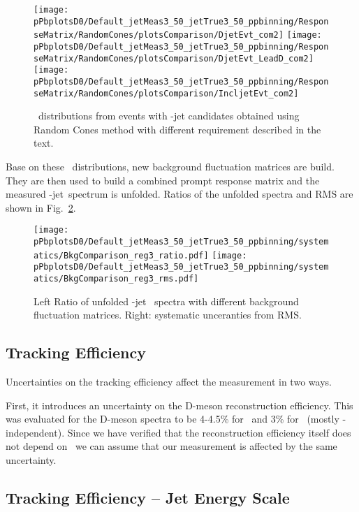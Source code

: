 \begin{figure}[bth]
\centering
\texttt{[image: pPbplotsD0/Default\_jetMeas3\_50\_jetTrue3\_50\_ppbinning/ResponseMatrix/RandomCones/plotsComparison/DjetEvt\_com2]}
\texttt{[image: pPbplotsD0/Default\_jetMeas3\_50\_jetTrue3\_50\_ppbinning/ResponseMatrix/RandomCones/plotsComparison/DjetEvt\_LeadD\_com2]}
\texttt{[image: pPbplotsD0/Default\_jetMeas3\_50\_jetTrue3\_50\_ppbinning/ResponseMatrix/RandomCones/plotsComparison/IncljetEvt\_com2]}
\caption{\deltapt\ distributions from events with \Dzero-jet candidates obtained using Random Cones method with different requirement described in the text.}
\label{fig:DeltaPt_DzeroSys}%
\end{figure}

Base on these \deltapt\ distributions, new background fluctuation matrices are build. They are then used to build a combined prompt response matrix and the measured \Dzero-jet\ \pt spectrum is unfolded. Ratios of the unfolded spectra and RMS are shown in Fig.~\ref{fig:BkgFlucSys_Dzero}.

\begin{figure}[bth]
\centering
\texttt{[image: pPbplotsD0/Default\_jetMeas3\_50\_jetTrue3\_50\_ppbinning/systematics/BkgComparison\_reg3\_ratio.pdf]}
\texttt{[image: pPbplotsD0/Default\_jetMeas3\_50\_jetTrue3\_50\_ppbinning/systematics/BkgComparison\_reg3\_rms.pdf]}
\caption{ Left Ratio of unfolded \Dzero-jet \pt\ spectra with different background fluctuation matrices. Right: systematic unceranties from RMS.}
\label{fig:BkgFlucSys_Dzero}
\end{figure}


\subsection{Tracking Efficiency}
Uncertainties on the tracking efficiency affect the measurement in two ways. 

First, it introduces an uncertainty on the D-meson reconstruction efficiency. This was evaluated for the D-meson spectra to be 4-4.5\% for \Dstar\ and 3\% for \Dzero\ (mostly \pt-independent). Since we have verified that the reconstruction efficiency itself does not depend on \ptchjet\ we can assume that our measurement is affected by the same uncertainty.

\subsection{Tracking Efficiency -- Jet Energy Scale}


